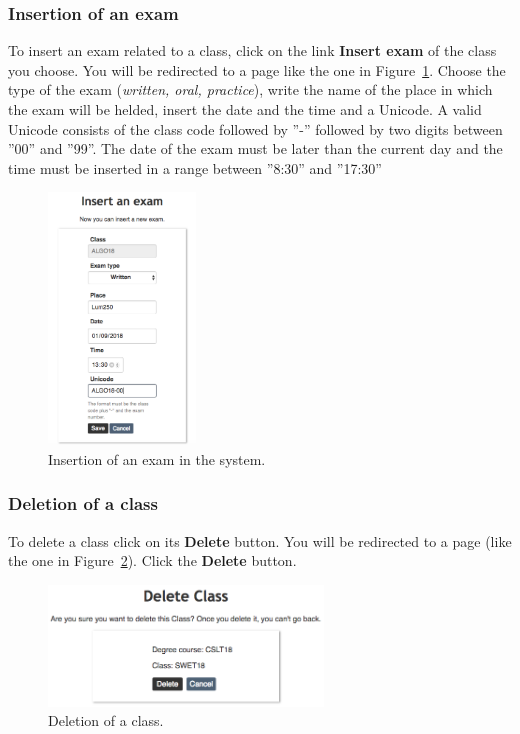 \subsubsection{Insertion of an exam} \label{subsec:exaIns}
To insert an exam related to a class, click on the link \textbf{Insert exam} of the class you choose. You will be redirected to a page like the one in Figure~\ref{fig:insertExam}. Choose the type of the exam (\emph{written, oral, practice}), write the name of the place in which the exam will be helded, insert the date and the time and a Unicode. A valid Unicode consists of the class code followed by ''-'' followed by two digits between ''00'' and ''99''. The date of the exam must be later than the current day and the time must be inserted in a range between ''8:30'' and ''17:30''
\begin{figure}[H]
	\centering
	\includegraphics[width=0.35\textwidth]{img/insertExam.png}
	\caption{Insertion of an exam in the system.}
	\label{fig:insertExam}
\end{figure}

\subsubsection{Deletion of a class}
To delete a class click on its \textbf{Delete} button. You will be redirected to a page (like the one in Figure~\ref{fig:deleteClass}). Click the \textbf{Delete} button.%
\begin{figure}[H]
	\centering
	\includegraphics[width=0.65\textwidth]{img/deleteClass.png}
	\caption{Deletion of a class.}
	\label{fig:deleteClass}
\end{figure}

